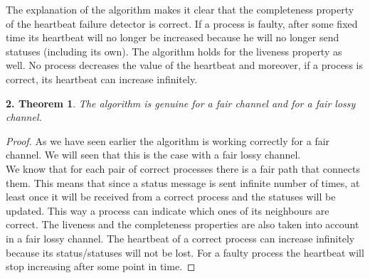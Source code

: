 \documentclass[12pt]{article}
\theoremstyle{plain}
\begin{document}
The explanation of the algorithm makes it clear that the completeness property
of the heartbeat failure detector is correct. If a process is faulty, after some
fixed time its heartbeat will no longer be increased because he will no longer
send statuses (including its own). The algorithm holds for the liveness property
as well. No process decreases the value of the heartbeat and moreover, if a
process is correct, its heartbeat can increase infinitely.\\

\newtheorem*{th2}{2. Theorem}
\begin{th2}
  The algorithm is genuine for a fair channel and for a fair lossy channel.
\end{th2}
\begin{proof}[Proof]
  As we have seen earlier the algorithm is working correctly for a fair channel.
  We will seen that this is the case with a fair lossy channel. \\
  We know that for each pair of correct processes there is a fair path that
  connects them. This means that since a status message is sent infinite
  number of times, at least once it will be received from a correct process and
  the statuses will be updated. This way a process can indicate which ones of
  its neighbours are correct. The liveness and the completeness properties are
  also taken into account in a fair lossy channel. The heartbeat of a correct
  process can increase infinitely because its status/statuses will not be lost.
  For a faulty process the heartbeat will stop increasing after some point in
  time.
\end{proof}
\end{document}
